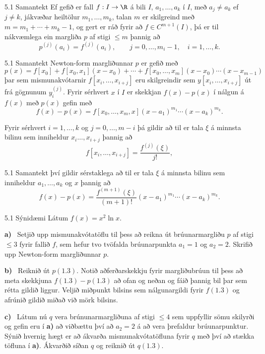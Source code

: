\begin{frame}{5.1 Samantekt} 
Ef gefið er fall $f:I\to \R$ á bili $I$, $a_1,\dots,a_k$ í $I$, 
með $a_j\neq a_k$ ef $j\neq k$, jákvæðar heiltölur $m_1,\dots,m_k$,  
talan $m$ er skilgreind með $m=m_1+\cdots+m_k-1$, og gert er ráð fyrir
að $f\in C^{m+1}(I)$, þá er til nákvæmlega ein margliða $p$
af stigi $\leq m$ þannig að
$$
p^{(j)}(a_i)=f^{(j)}(a_i), \qquad j=0,\dots, m_i-1, \quad i=1,\dots,k. 
$$  
\end{frame} 

\begin{frame}{5.1 Samantekt} 
Newton-form margliðunnar $p$ er gefið með
$$
  p(x)=f[x_0]+f[x_0,x_1](x-x_0)+\cdots+f[x_0,\dots,x_m](x-x_0)\cdots(x-x_{m-1})
$$
þar sem mismunakvótarnir $f[x_i,\dots,x_{i+j}]$ eru skilgreindir sem
$y[x_i,\dots,x_{i+j}]$ út frá gögnunum $y^{(j)}_i$.  Fyrir sérhvert
$x$ í $I$ er skekkjan $f(x)-p(x)$ í nálgun á $f(x)$ með $p(x)$ gefin með
$$
  f(x)-p(x)=f[x_0,\dots,x_m,x](x-a_1)^{m_1}\cdots(x-a_k)^{m_k}.
$$

\pause
Fyrir sérhvert $i=1,\dots,k$ og $j=0,\dots,m-i$ þá gildir að til er
tala $\xi$ á minnsta bilinu sem inniheldur $x_i\dots,x_{i+j}$  þannig
að
$$
  f[x_i,\dots,x_{i+j}]=\dfrac{f^{(j)}(\xi)}{j!},
$$
\end{frame}

\begin{frame}{5.1 Samantekt} 
því gildir sérstaklega að til er tala $\xi$ á minnsta bilinu sem
inniheldur $a_1,\dots,a_k$ og $x$ þannig að 
$$
f(x)-p(x)=\dfrac{f^{(m+1)}(\xi)}{(m+1)!}(x-a_1)^{m_1}\cdots(x-a_k)^{m_k}.
$$
\end{frame}

\begin{frame}{5.1 Sýnidæmi} 
Látum $f(x)=x^2\ln x$.  

\smallskip
{\bf a)} \  Setjið upp mismunakvótatöflu til þess að 
reikna út brúunarmargliðu $p$ af stigi $\leq 3$  fyrir fallið $f$, 
sem hefur tvo tvöfalda brúunarpunkta $a_1=1$ og $a_2=2$.
Skrifið upp Newton-form margliðunnar $p$.

\pause
\smallskip
{\bf b)} \  Reiknið út  $p(1.3)$. Notið aðferðarskekkju
fyrir margliðubrúun til þess að meta skekkjuna
$f(1.3)-p(1.3)$ að ofan og neðan og fáið þannig bil
þar sem rétta gildið liggur.  Veljið miðpunkt bilsins
sem nálgunargildi fyrir $f(1.3)$ og afrúnið gildið miðað
við mörk bilsins.

\pause
\smallskip
{\bf c)} \ Látum nú $q$ vera brúnunarmargliðuna
af stigi $\leq 4$  sem uppfyllir sömu skilyrði og gefin eru í {\bf a)}
að viðbættu því að $a_2=2$ á að vera þrefaldur brúunarpunktur.
Sýnið hvernig hægt er að ákvarða  mismunakvótatöfluna fyrir $q$
með því  að stækka töfluna í {\bf a)}.  Ákvarðið síðan $q$ og 
reiknið út $q(1.3)$.
\end{frame}

